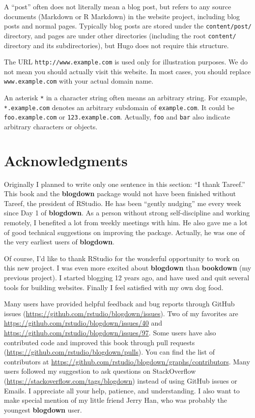 \documentclass[12pt,]{krantz}
\theoremstyle{definition}
\theoremstyle{definition}
\theoremstyle{definition}
\theoremstyle{remark}
\begin{document}
A ``post'' often does not literally mean a blog post, but refers to any
source documents (Markdown or R Markdown) in the website project,
including blog posts and normal pages. Typically blog posts are stored
under the \texttt{content/post/} directory, and pages are under other
directories (including the root \texttt{content/} directory and its
subdirectories), but Hugo does not require this structure.

The URL \texttt{http://www.example.com} is used only for illustration
purposes. We do not mean you should actually visit this website. In most
cases, you should replace \texttt{www.example.com} with your actual
domain name.

An asterisk \texttt{*} in a character string often means an arbitrary
string. For example, \texttt{*.example.com} denotes an arbitrary
subdomain of \texttt{example.com}. It could be \texttt{foo.example.com}
or \texttt{123.example.com}. Actually, \texttt{foo} and \texttt{bar}
also indicate arbitrary characters or objects.

\section*{Acknowledgments}\label{acknowledgments}


Originally I planned to write only one sentence in this section: ``I
thank Tareef.'' This book and the \textbf{blogdown} package would not
have been finished without Tareef, the president of RStudio. He has been
``gently nudging'' me every week since Day 1 of \textbf{blogdown}. As a
person without strong self-discipline and working remotely, I benefited
a lot from weekly meetings with him. He also gave me a lot of good
technical suggestions on improving the package. Actually, he was one of
the very earliest users of \textbf{blogdown}.

Of course, I'd like to thank RStudio for the wonderful opportunity to
work on this new project. I was even more excited about
\textbf{blogdown} than \textbf{bookdown} (my previous project). I
started blogging 12 years ago, and have used and quit several tools for
building websites. Finally I feel satisfied with my own dog food.

Many users have provided helpful feedback and bug reports through GitHub
issues (\url{https://github.com/rstudio/blogdown/issues}). Two of my
favorites are \url{https://github.com/rstudio/blogdown/issues/40} and
\url{https://github.com/rstudio/blogdown/issues/97}. Some users have
also contributed code and improved this book through pull requests
(\url{https://github.com/rstudio/blogdown/pulls}). You can find the list
of contributors at
\url{https://github.com/rstudio/blogdown/graphs/contributors}. Many
users followed my suggestion to ask questions on StackOverflow
(\url{https://stackoverflow.com/tags/blogdown}) instead of using GitHub
issues or Emails. I appreciate all your help, patience, and
understanding. I also want to make special mention of my little friend
Jerry Han, who was probably the youngest \textbf{blogdown} user.
\end{document}
